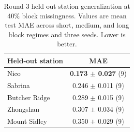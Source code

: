 \begin{table}[t]
  \centering
  \caption{Round 3 held-out station generalization at 40\% block missingness. Values are mean test MAE across short, medium, and long block regimes and three seeds. Lower is better.}
  \label{tab:round3-heldout}
  \begin{tabular}{lc}
    \toprule
    Held-out station & MAE \\
    \midrule
    Nico & \textbf{0.173 $\pm$ 0.027} (9) \\
    Sabrina & 0.246 $\pm$ 0.011 (9) \\
    Butcher Ridge & 0.289 $\pm$ 0.015 (9) \\
    Zhongshan & 0.307 $\pm$ 0.034 (9) \\
    Mount Sidley & 0.350 $\pm$ 0.029 (9) \\
    \bottomrule
  \end{tabular}
\end{table}
